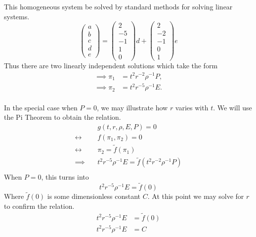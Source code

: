 \documentclass[12pt,twoside]{article}
\begin{document}
  This homogeneous system be solved by standard methods for solving linear
  systems.
  \begin{equation*}
    \begin{pmatrix}
      a \\ b \\ c \\ d \\ e
    \end{pmatrix}
    =
    \begin{pmatrix}
      2 \\ -5 \\ -1 \\ 1 \\ 0
    \end{pmatrix} d
    +
    \begin{pmatrix}
      2 \\ -2 \\ -1 \\ 0 \\ 1
    \end{pmatrix}
    e
  \end{equation*}
  Thus there are two linearly independent solutions which take the form
  \begin{equation}
    \label{eq:4-p-ne-sol}
    \boxed{
      \begin{aligned}
        \implies \pi_1 &= t^2r^{-2}\rho^{-1}P, \\
        \implies \pi_2 &= t^2r^{-5}\rho^{-1}E. \\
      \end{aligned}
    }
  \end{equation}

  In the special case when $P=0$, we may illustrate how $r$ varies with $t$. We
  will use the Pi Theorem to obtain the relation.
  \begin{equation*}
    \begin{aligned}
      & g(t,r,\rho,E,P) = 0 \\
      \leftrightarrow\quad& f(\pi_1, \pi_2) = 0 \\
      \leftrightarrow\quad& \pi_2 = \tilde{f}(\pi_1) \\
      \implies\quad& t^2r^{-5}\rho^{-1}E = \tilde{f}(t^2r^{-2}\rho^{-1}P) \\
    \end{aligned}
  \end{equation*}
  When $P=0$, this turns into
  \begin{equation*}
    t^2r^{-5}\rho^{-1}E = \tilde{f}(0)
  \end{equation*}
  Where $\tilde{f}(0)$ is some dimensionless constant $C$. At this point we may
  solve for $r$ to confirm the relation.
  \begin{equation*}
    \begin{aligned}
      t^2r^{-5}\rho^{-1}E &= \tilde{f}(0) \\
      t^2r^{-5}\rho^{-1}E &= C \\
    \end{aligned}
  \end{equation*}
\end{document}
